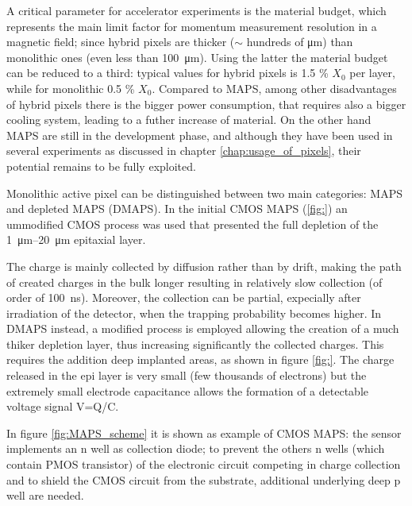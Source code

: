    A critical parameter for accelerator experiments is the material budget, which represents the main limit factor for momentum measurement resolution in a magnetic field; since hybrid pixels are thicker ($\sim$ hundreds of \si{\um}) than monolithic ones (even less than \SI{100}{\um}). Using the latter the material budget can be reduced to a third: typical values for hybrid pixels is 1.5 \% $X_0$ per layer, while for monolithic 0.5 \% $X_0$. Compared to MAPS, among other disadvantages of hybrid pixels there is the bigger power consumption, that requires also a bigger cooling system, leading to a futher increase of material.
   On the other hand MAPS are still in the development phase, and although they have been used in several experiments as discussed in chapter \ref{chap:usage_of_pixels}, their potential remains to be fully exploited.

   Monolithic active pixel can be distinguished between two main categories: MAPS and depleted MAPS (DMAPS).
   In the initial CMOS MAPS (\ref{fig:}) an ummodified CMOS process was used that presented the full depletion of the \SIrange{1}{20}{\um} epitaxial layer.

   The charge is mainly collected by diffusion rather than by drift, making the path of created charges in the bulk longer resulting in relatively slow collection (of order of \SI{100}{ns}). 
   Moreover, the collection can be partial, expecially after irradiation of the detector, when the trapping probability becomes higher. 
   In DMAPS instead, a modified process is employed allowing the creation of a much thiker depletion layer, thus increasing significantly the collected charges. This requires the addition deep implanted areas, as shown in figure \ref{fig:}. The charge released in the epi layer is very small (few thousands of electrons) but the extremely small electrode capacitance allows the formation of a detectable voltage signal V=Q/C.
   
   In figure \ref{fig:MAPS_scheme} it is shown as example of CMOS MAPS: the sensor implements an n well as collection diode; to prevent the others n wells (which contain PMOS transistor) of the electronic circuit competing in charge collection and to shield the CMOS circuit from the substrate, additional underlying deep p well are needed.
   

